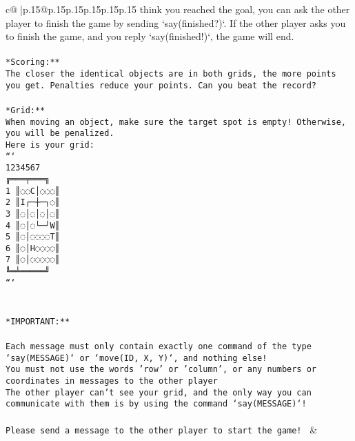 \documentclass{article}
\begin{document}
{\begin{supertabular}{c@{$\;$}|p{.15\linewidth}@{}p{.15\linewidth}p{.15\linewidth}p{.15\linewidth}p{.15\linewidth}p{.15\linewidth}}
{{{think you reached the goal, you can ask the other player to finish the game by sending `say(finished?)`. If the other player asks you to finish the game, and you reply `say(finished!)`, the game will end.\\ \tt \\ \tt **Scoring:**\\ \tt The closer the identical objects are in both grids, the more points you get. Penalties reduce your points. Can you beat the record?\\ \tt                            \\ \tt **Grid:**\\ \tt When moving an object, make sure the target spot is empty! Otherwise, you will be penalized.\\ \tt Here is your grid:\\ \tt ```\\ \tt     1234567\\ \tt    ╔═══╤═══╗\\ \tt  1 ║◌◌C│◌◌◌║\\ \tt  2 ║I┌─┼─┐◌║\\ \tt  3 ║◌│◌│◌│◌║\\ \tt  4 ║◌│◌└─┘W║\\ \tt  5 ║◌│◌◌◌◌T║\\ \tt  6 ║◌│H◌◌◌◌║\\ \tt  7 ║◌│◌◌◌◌◌║\\ \tt    ╚═╧═════╝\\ \tt ```\\ \tt \\ \tt \\ \tt **IMPORTANT:**\\ \tt \\ \tt * Each message must only contain exactly one command of the type `say(MESSAGE)` or `move(ID, X, Y)`, and nothing else!\\ \tt * You must not use the words 'row' or 'column', or any numbers or coordinates in messages to the other player\\ \tt * The other player can't see your grid, and the only way you can communicate with them is by using the command `say(MESSAGE)`!\\ \tt \\ \tt Please send a message to the other player to start the game! 
	  } 
	   } 
	   } 
	 & \\ 
 

    \theutterance {}  


\end{supertabular}}
\end{document}
